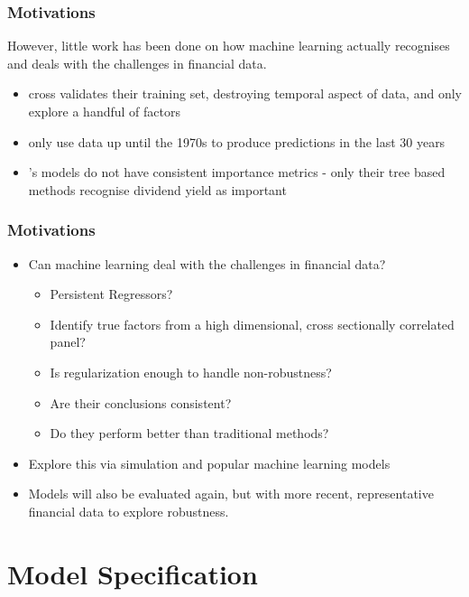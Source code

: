\documentclass[]{beamer}
\begin{document}
\begin{frame}
\frametitle{Motivations}
However, little work has been done on how machine learning actually recognises and deals with the challenges in financial data. 
\begin{itemize}
	\item \cite{feng_deep_2018} cross validates their training set, destroying temporal aspect of data, and only explore a handful of factors
	\item \cite{gu_empirical_2018} only use data up until the 1970s to produce predictions in the last 30 years
	\item \cite{gu_empirical_2018}'s models do not have consistent importance metrics - only their tree based methods recognise dividend yield as important
\end{itemize}
\end{frame}

\begin{frame}
\frametitle{Motivations}
\begin{itemize}
\item Can machine learning deal with the challenges in financial data?
\begin{itemize}
	\item Persistent Regressors?
	\item Identify true factors from a high dimensional, cross sectionally correlated panel?
	\item Is regularization enough to handle non-robustness?
	\item Are their conclusions consistent?
	\item Do they perform better than traditional methods?
\end{itemize}

\item Explore this via simulation and popular machine learning models
\item Models will also be evaluated again, but with more recent, representative financial data to explore robustness. 
\end{itemize}
\end{frame}

\section{Model Specification}
\end{document}

